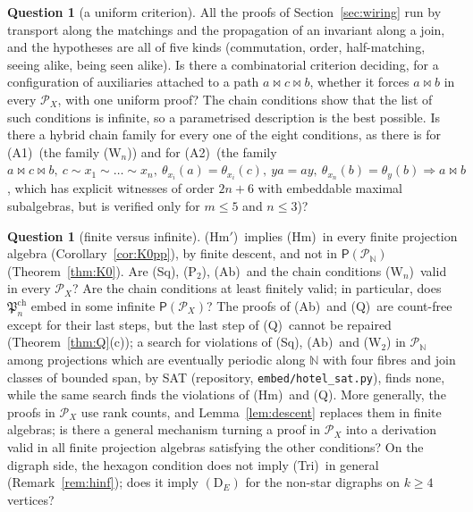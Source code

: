\documentclass[11pt]{amsart}
\theoremstyle{definition}
\newtheorem{question}[theorem]{Question}
\renewcommand{\P}{\mathcal{P}}      %
\newcommand{\PA}{\mathsf{P}}         %
\newcommand{\mt}{\bowtie}      %
\newcommand{\Tri}{\textup{(Tri)}}
\newcommand{\Wire}{\textup{(Sq)}}      %
\newcommand{\Rcond}{\textup{(A1)}}     %
\newcommand{\Rp}{\textup{(A2)}}        %
\newcommand{\Ptwo}{\textup{(P$_2$)}}
\newcommand{\Qcond}{\textup{(Q)}}
\newcommand{\Kzero}{\textup{(Hm)}}     %
\newcommand{\Hmp}{\textup{(Hm$'$)}}     %
\newcommand{\Kfour}{\textup{(Ab)}}     %
\newcommand{\Wn}[1][n]{\textup{(W$_{#1}$)}}
\begin{document}
\begin{question}[a uniform criterion]\label{q:criterion}
All the proofs of Section~\ref{sec:wiring} run by transport along the matchings and the propagation of an invariant along a join, and the hypotheses are all of five kinds (commutation, order, half-matching, seeing alike, being seen alike). Is there a combinatorial criterion deciding, for a configuration of auxiliaries attached to a path $a\mt c\mt b$, whether it forces $a\mt b$ in every $\P_X$, with one uniform proof? The chain conditions show that the list of such conditions is infinite, so a parametrised description is the best possible. Is there a hybrid chain family for every one of the eight conditions, as there is for \Rcond\ (the family \Wn) and for \Rp\ (the family $a\mt c\mt b,\ c\sim x_1\sim\dots\sim x_n,\ \theta_{x_i}(a)=\theta_{x_i}(c),\ ya=ay,\ \theta_{x_n}(b)=\theta_y(b)\Rightarrow a\mt b$, which has explicit witnesses of order $2n+6$ with embeddable maximal subalgebras, but is verified only for $m\le5$ and $n\le3$)?
\end{question}

\begin{question}[finite versus infinite]\label{q:infinite}
\Hmp\ implies \Kzero\ in every finite projection algebra (Corollary~\ref{cor:K0pp}), by finite descent, and not in $\PA(\P_{\mathbb N})$ (Theorem~\ref{thm:K0}). Are \Wire, \Ptwo, \Kfour\ and the chain conditions \Wn\ valid in every $\P_X$? Are the chain conditions at least finitely valid; in particular, does $\mathfrak P^{\mathrm{ch}}_n$ embed in some infinite $\PA(\P_X)$? The proofs of \Kfour\ and \Qcond\ are count-free except for their last steps, but the last step of \Qcond\ cannot be repaired (Theorem~\ref{thm:Q}(c)); a search for violations of \Wire, \Kfour\ and \Wn[2] in $\P_{\mathbb N}$ among projections which are eventually periodic along $\mathbb N$ with four fibres and join classes of bounded span, by SAT (repository, \texttt{embed/hotel\_sat.py}), finds none, while the same search finds the violations of \Kzero\ and \Qcond. More generally, the proofs in $\P_X$ use rank counts, and Lemma~\ref{lem:descent} replaces them in finite algebras; is there a general mechanism turning a proof in $\P_X$ into a derivation valid in all finite projection algebras satisfying the other conditions? On the digraph side, the hexagon condition does not imply \Tri\ in general (Remark~\ref{rem:hinf}); does it imply $(\mathrm D_E)$ for the non-star digraphs on $k\ge4$ vertices?
\end{question}
\end{document}
